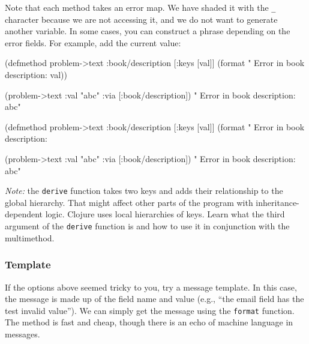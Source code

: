 \fi


Note that each method takes an error map. We have shaded it with the \verb|_| character because we are not accessing it, and we do not want to generate another variable. In some cases, you can construct a phrase depending on the error fields. For example, add the current value:

\ifx\DEVICETYPE\MOBILE

  \begin{clojure}
(defmethod problem->text
  :book/description
  [{:keys [val]}]
  (format  " Error in book description: %
    val))

(problem->text
  {:val "abc" :via [:book/description]})
" Error in book description: abc"
  \end{clojure}

\else

  \begin{clojure}
(defmethod problem->text :book/description
  [{:keys [val]}]
  (format  " Error in book description: %

(problem->text {:val "abc" :via [:book/description]})
" Error in book description: abc"
  \end{clojure}

\fi

\emph{Note:} the \verb|derive| function takes two keys and adds their relationship to the global hierarchy. That might affect other parts of the program with inheritance-dependent logic. Clojure uses local hierarchies of keys. Learn what the third argument of the \verb|derive| function is and how to use it in conjunction with the multimethod.

\subsubsection{Template}


If the options above seemed tricky to you, try a message template. In this case, the message is made up of the field name and value (e.g., ``the email field has the test invalid value''). We can simply get the message using the \verb|format| function. The method is fast and cheap, though there is an echo of machine language in messages.

